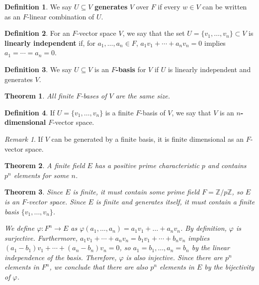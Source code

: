 \documentclass[
    parskip=half,
    toc=flat,
    toc=sectionentrydotfill,
]{scrartcl}  %
\theoremstyle{definition}
\newtheorem{definition}{Definition}[section]
\theoremstyle{plain}
\newtheorem{theorem}{Theorem}[definition]
\theoremstyle{remark}
\newtheorem{remark}{Remark}[definition]
\begin{document}
\begin{definition}
    We say $U\subseteq V$ \textbf{generates} $V$ over $F$ if every $w\in V$ can be written as an
    $F$-linear combination of $U$.
\end{definition}

\begin{definition}
    For an $F$-vector space $V$, we say that the set $U=\{v_1,\dots,v_n\}\subset V$ is
    \textbf{linearly independent} if, for $a_1,\dots,a_n\in F$, $a_1v_1+\cdots+a_nv_n=0$ implies
    $a_1=\cdots=a_n=0$.
\end{definition}

\begin{definition}
    We say $U\subseteq V$ is an \textbf{$F$-basis} for $V$ if $U$ is linearly independent and
    generates $V$.
\end{definition}

\begin{theorem}
    All finite $F$-bases of $V$ are the same size.
\end{theorem}

\begin{definition}
    If $U=\{v_1,\dots,v_n\}$ is a finite $F$-basis of $V$, we say that $V$ is an
    \textbf{$n$-dimensional} $F$-vector space.
\end{definition}

\begin{remark}
    If $V$ can be generated by a finite basis, it is finite dimensional as an $F$-vector space.
\end{remark}

\begin{theorem}
    A finite field $E$ has a positive prime characteristic $p$ and contains $p^n$ elements for some
    $n$.
\end{theorem}

\begin{theorem}
    Since $E$ is finite, it must contain some prime field $F=\mathbb{Z}/p\mathbb{Z}$, so $E$ is an
    $F$-vector space.
    Since $E$ is finite and generates itself, it must contain a finite basis $\{v_1,\dots,v_n\}$.

    We define $\varphi:F^n\to E$ as $\varphi(a_1,\dots,a_n)=a_1v_1+\dots+a_nv_n$.
    By definition, $\varphi$ is surjective.
    Furthermore, $a_1v_1+\cdots+a_nv_n=b_1v_1+\cdots+b_nv_n$ implies 
    $(a_1-b_1)v_1+\cdots+(a_n-b_n)v_n=0$, so $a_1=b_1,\dots,a_n=b_n$ by the linear independence of
    the basis.
    Therefore, $\varphi$ is also injective.
    Since there are $p^n$ elements in $F^n$, we conclude that there are also $p^n$ elements in $E$
    by the bijectivity of $\varphi$.
\end{theorem}
\end{document}
